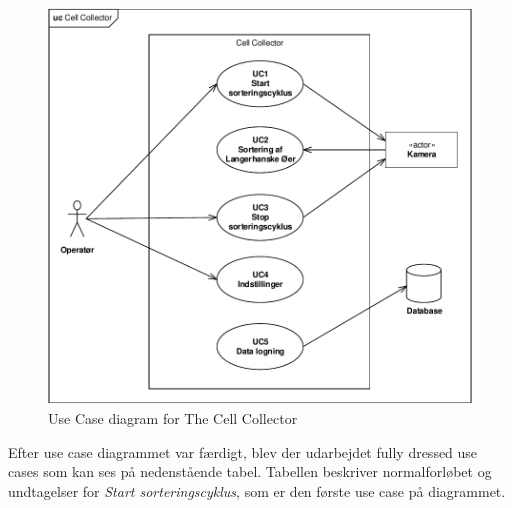 \begin{figure}[H]
	\centering
	\includegraphics[width=1\textwidth]{billeder/UC_CellCollector.pdf}
	\caption{Use Case diagram for The Cell Collector}
	\label{fig:usecase}
\end{figure}
Efter use case diagrammet var færdigt, blev der udarbejdet fully dressed use cases som kan ses på nedenstående tabel. Tabellen beskriver normalforløbet og undtagelser for \textit{Start sorteringscyklus}, som er den første use case på diagrammet. 
\newpage 

